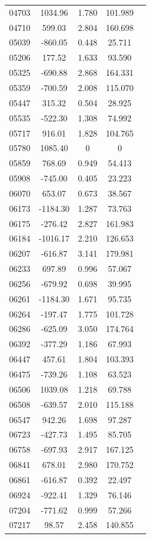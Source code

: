 {\begin{longtable}{ccccc}
04703 & 1034.96 & 1.780 & 101.989\\
04710 & 599.03 & 2.804 & 160.698\\
05039 & -860.05 & 0.448 & 25.711\\
05206 & 177.52 & 1.633 & 93.590\\
05325 & -690.88 & 2.868 & 164.331\\
05359 & -700.59 & 2.008 & 115.070\\
05447 & 315.32 & 0.504 & 28.925\\
05535 & -522.30 & 1.308 & 74.992\\
05717 & 916.01 & 1.828 & 104.765\\
05780 & 1085.40 & 0 & 0\\
05859 & 768.69 & 0.949 & 54.413\\
05908 & -745.00 & 0.405 & 23.223\\
06070 & 653.07 & 0.673 & 38.567\\
06173 & -1184.30 & 1.287 & 73.763\\
06175 & -276.42 & 2.827 & 161.983\\
06184 & -1016.17 & 2.210 & 126.653\\
06207 & -616.87 & 3.141 & 179.981\\
06233 & 697.89 & 0.996 & 57.067\\
06256 & -679.92 & 0.698 & 39.995\\
06261 & -1184.30 & 1.671 & 95.735\\
06264 & -197.47 & 1.775 & 101.728\\
06286 & -625.09 & 3.050 & 174.764\\
06392 & -377.29 & 1.186 & 67.993\\
06447 & 457.61 & 1.804 & 103.393\\
06475 & -739.26 & 1.108 & 63.523\\
06506 & 1039.08 & 1.218 & 69.788\\
06508 & -639.57 & 2.010 & 115.188\\
06547 & 942.26 & 1.698 & 97.287\\
06723 & -427.73 & 1.495 & 85.705\\
06758 & -697.93 & 2.917 & 167.125\\
06841 & 678.01 & 2.980 & 170.752\\
06861 & -616.87 & 0.392 & 22.497\\
06924 & -922.41 & 1.329 & 76.146\\
07204 & -771.62 & 0.999 & 57.266\\
07217 & 98.57 & 2.458 & 140.855\\

\end{longtable}}
